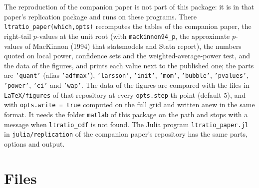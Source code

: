 \documentclass[11pt]{article}
\newcommand{\code}[1]{\texttt{#1}}
\begin{document}
The reproduction of the companion paper is not part of this package: it is in that paper's replication package and runs on these programs.  There \code{ltratio\_paper(which,opts)} recomputes the tables of the companion paper, the right-tail $p$-values at the unit root (with \code{mackinnon94\_p}, the approximate $p$-values of MacKinnon (1994) that statsmodels and Stata report), the numbers quoted on local power, confidence sets and the weighted-average-power test, and the data of the figures, and prints each value next to the published one; the parts are \code{'quant'} (alias \code{'adfmax'}), \code{'larsson'}, \code{'init'}, \code{'mom'}, \code{'bubble'}, \code{'pvalues'}, \code{'power'}, \code{'ci'} and \code{'wap'}.  The data of the figures are compared with the files in \code{LaTeX/figures} of that repository at every \code{opts.step}-th point (default $5$), and with \code{opts.write = true} computed on the full grid and written anew in the same format.  It needs the folder \code{matlab} of this package on the path and stops with a message when \code{ltratio\_cdf} is not found.  The Julia program \code{ltratio\_paper.jl} in \code{julia/replication} of the companion paper's repository has the same parts, options and output.

\section{Files}
\label{sec:files}
\end{document}
